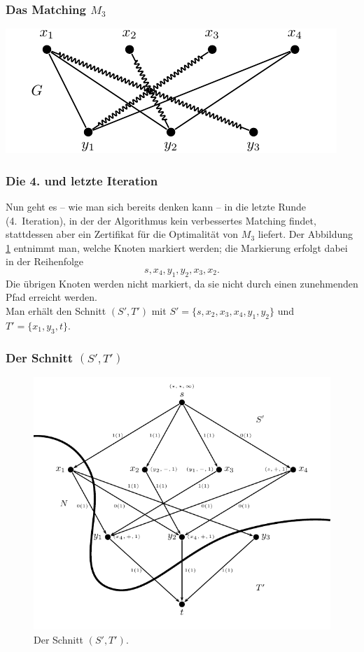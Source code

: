 \documentclass[smaller]{beamer}
\begin{document}
\begin{frame}
\frametitle{Das Matching $M_3$}
\begin{center}
 \includegraphics{fig55.pdf}
\end{center}
\end{frame}

\begin{frame}
 \frametitle{Die 4. und letzte Iteration}
 Nun geht es -- wie man sich bereits denken kann -- in die letzte Runde (4.~Iteration), in der der Algorithmus kein verbessertes Matching findet, stattdessen aber ein \alert{Zertifikat für die Optimalität von $M_3$} liefert. Der Abbildung \ref{abb:11:8} entnimmt man, welche Knoten markiert werden; die Markierung erfolgt dabei in der Reihenfolge 
 $$s,x_4,y_1,y_2,x_3,x_2.$$
 Die übrigen Knoten werden nicht markiert, da sie nicht durch einen zunehmenden Pfad erreicht werden. \\ \vspace*{0.2cm}
 Man erhält den Schnitt $(S',T')$ mit $S'=\bigl\{ s,x_2,x_3,x_4,y_1,y_2 \bigr\}$ und $T'=\bigl\{ x_1,y_3,t \bigr\}$.
\end{frame}

\begin{frame}
 \frametitle{Der Schnitt $(S',T')$}
\begin{figure}[H]
\begin{center}
 \includegraphics[scale=0.72]{fig56.pdf}
\end{center}
\caption{Der Schnitt $(S',T')$.}
\label{abb:11:8}
\end{figure}
\end{frame}
\end{document}
